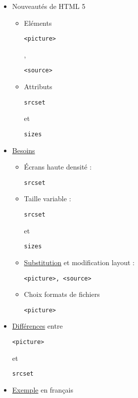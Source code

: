 \begin{itemize}
\tightlist
\item
  Nouveautés de HTML 5

  \begin{itemize}
  \tightlist
  \item
    Eléments
    \begin{otherlanguage}{english}\texttt{\textless{}picture\textgreater{}}\end{otherlanguage},
    \begin{otherlanguage}{english}\texttt{\textless{}source\textgreater{}}\end{otherlanguage}
  \item
    Attributs
    \begin{otherlanguage}{english}\texttt{srcset}\end{otherlanguage} et
    \begin{otherlanguage}{english}\texttt{sizes}\end{otherlanguage}
  \end{itemize}
\item
  \href{http://www.smashingmagazine.com/2014/05/14/responsive-images-done-right-guide-picture-srcset/}{Besoins}

  \begin{itemize}
  \tightlist
  \item
    Écrans haute densité :
    \begin{otherlanguage}{english}\texttt{srcset}\end{otherlanguage}
  \item
    Taille variable :
    \begin{otherlanguage}{english}\texttt{srcset}\end{otherlanguage} et
    \begin{otherlanguage}{english}\texttt{sizes}\end{otherlanguage}
  \item
    \href{http://ericportis.com/etc/smashing-mag-picture-examples/art-direction.html}{Substitution}
    et modification layout :
    \begin{otherlanguage}{english}\texttt{\textless{}picture\textgreater{},\ \textless{}source\textgreater{}}\end{otherlanguage}
  \item
    Choix formats de fichiers
    \begin{otherlanguage}{english}\texttt{\textless{}picture\textgreater{}}\end{otherlanguage}
  \end{itemize}
\item
  \href{https://css-tricks.com/responsive-images-youre-just-changing-resolutions-use-srcset/}{Différences}
  entre
  \begin{otherlanguage}{english}\texttt{\textless{}picture\textgreater{}}\end{otherlanguage}
  et \begin{otherlanguage}{english}\texttt{srcset}\end{otherlanguage}
\item
  \href{http://www.hteumeuleu.fr/attribut-srcset-images-responsive/}{Exemple}
  en français
\end{itemize}

